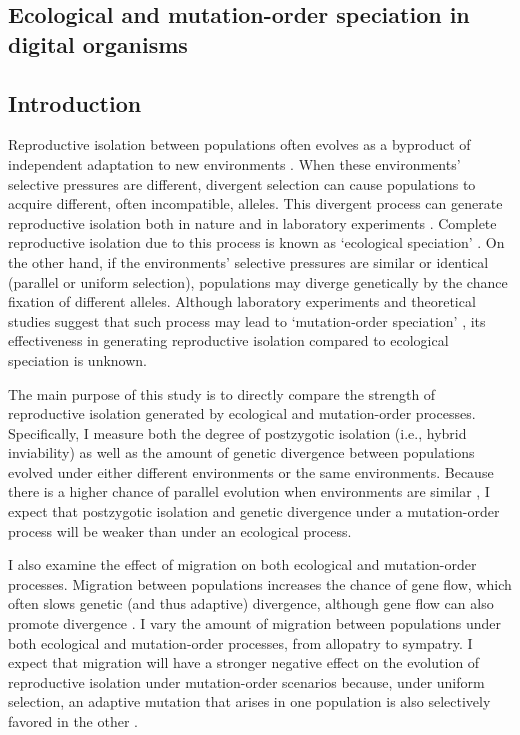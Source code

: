 \begin{doublespace}

\chapter{Ecological and mutation-order speciation in digital organisms}
\label{chap:ecol_mo}



\section{Introduction}

Reproductive isolation between populations
often evolves as a byproduct of independent adaptation
to new environments \citep{coy04,sch09,sob10}.
%
When these environments' selective pressures are different,
divergent selection can cause populations
to acquire different, often incompatible, alleles.
%
This divergent process can generate reproductive isolation
both in nature \citep[reviewed in][]{run05,sch09}
and in laboratory experiments \citetext{\citealp{det07,det08};
reviewed in \citealp{ric93} and \citealp{fry09}}.
%
Complete reproductive isolation due to this process
is known as `ecological speciation' \citep{sch09}.
%
On the other hand, if the environments' selective pressures
are similar or identical (parallel or uniform selection),
populations may diverge genetically
by the chance fixation of different alleles.
%
Although laboratory experiments and theoretical studies suggest that
such process may lead to `mutation-order speciation' \citep{sch09,nos11},
its effectiveness in generating reproductive isolation
compared to ecological speciation is unknown.



The main purpose of this study is to directly compare
the strength of reproductive isolation
generated by ecological and mutation-order processes.
%
Specifically, I measure both the degree of postzygotic isolation
(i.e., hybrid inviability)
as well as the amount of genetic divergence between populations
evolved under either different environments or the same environments.
%
Because there is a higher chance of parallel evolution
when environments are similar \citep{sch09b},
I expect that postzygotic isolation and genetic divergence
under a mutation-order process will be weaker than under an ecological process.



I also examine the effect of migration
on both ecological and mutation-order processes.
%
Migration between populations increases the chance of gene flow,
which often slows genetic (and thus adaptive) divergence,
although gene flow can also promote divergence \citep{gar06,ras08}.
%
I vary the amount of migration between populations
under both ecological and mutation-order processes,
from allopatry to sympatry.
%
I expect that migration will have a stronger negative effect
on the evolution of reproductive isolation under mutation-order scenarios
because, under uniform selection, an adaptive mutation
that arises in one population is also selectively
favored in the other \citep{sch09,nos09b,nos11}.




\end{doublespace}
